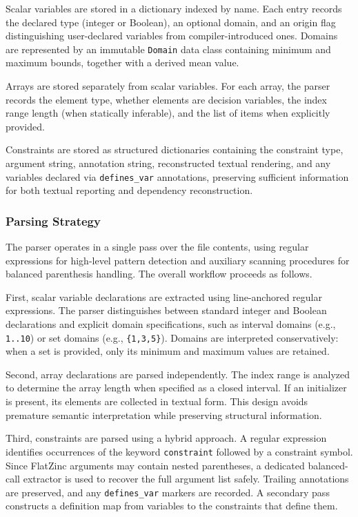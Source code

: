\documentclass[../../main]{subfiles}
\begin{document}
Scalar variables are stored in a dictionary indexed by name. Each entry records the declared type (integer or Boolean), an optional domain, and an origin flag distinguishing user-declared variables from compiler-introduced ones. Domains are represented by an immutable \texttt{Domain} data class containing minimum and maximum bounds, together with a derived mean value. 

Arrays are stored separately from scalar variables. For each array, the parser records the element type, whether elements are decision variables, the index range length (when statically inferable), and the list of items when explicitly provided.

Constraints are stored as structured dictionaries containing the constraint type, argument string, annotation string, reconstructed textual rendering, and any variables declared via \texttt{defines\_var} annotations, preserving sufficient information for both textual reporting and dependency reconstruction.

\subsubsection{Parsing Strategy}

The parser operates in a single pass over the file contents, using regular expressions for high-level pattern detection and auxiliary scanning procedures for balanced parenthesis handling. The overall workflow proceeds as follows.

First, scalar variable declarations are extracted using line-anchored regular expressions. The parser distinguishes between standard integer and Boolean declarations and explicit domain specifications, such as interval domains (e.g., \texttt{1..10}) or set domains (e.g., \texttt{\{1,3,5\}}). Domains are interpreted conservatively: when a set is provided, only its minimum and maximum values are retained.

Second, array declarations are parsed independently. The index range is analyzed to determine the array length when specified as a closed interval. If an initializer is present, its elements are collected in textual form. This design avoids premature semantic interpretation while preserving structural information.

Third, constraints are parsed using a hybrid approach. A regular expression identifies occurrences of the keyword \texttt{constraint} followed by a constraint symbol. Since FlatZinc arguments may contain nested parentheses, a dedicated balanced-call extractor is used to recover the full argument list safely. Trailing annotations are preserved, and any \texttt{defines\_var} markers are recorded. A secondary pass constructs a definition map from variables to the constraints that define them.
\end{document}
